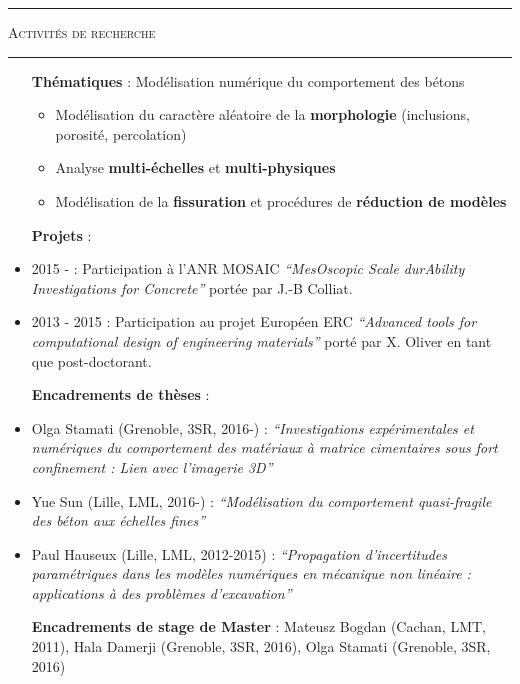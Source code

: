 \documentclass[a4paper,11pt]{article}
\newcommand{\titre}[1]{
  \begin{center}
    \rule{0.4\textwidth}{0.5pt}
    \par\vspace{0.1cm}
    \textsc{\large #1}
    \par\vspace{-0.2cm}
    \par\noindent\rule{0.4\textwidth}{0.5pt}
  \end{center}
}
\begin{document}
\newpage
\titre{Activités de recherche}
\begin{itemize}
  \item[\textbf{Thématiques}] : Modélisation numérique du comportement des bétons
    \begin{itemize}
    \item Modélisation du caractère aléatoire de la \textbf{morphologie} (inclusions, porosité, percolation)
    \item Analyse \textbf{multi-échelles} et \textbf{multi-physiques}
    \item Modélisation de la \textbf{fissuration} et procédures de \textbf{réduction de modèles}
    \end{itemize}
  \item[\textbf{Projets}] :
  \item 2015 - : Participation à l'ANR MOSAIC \textit{``MesOscopic Scale durAbility Investigations for Concrete''} portée par J.-B Colliat.
  \item 2013 - 2015 : Participation au projet Européen ERC \textit{``Advanced tools for computational design of engineering materials''} porté par X. Oliver en tant que post-doctorant.
  \item[\textbf{Encadrements de thèses}] :
  \item Olga Stamati (Grenoble, 3SR, 2016-) : \textit{``Investigations expérimentales et numériques du comportement des matériaux à matrice cimentaires sous fort confinement : Lien avec l'imagerie 3D''}
  \item Yue Sun (Lille, LML, 2016-) : \textit{``Modélisation du comportement quasi-fragile des béton aux échelles fines''}
  \item Paul Hauseux (Lille, LML, 2012-2015) : \textit{``Propagation d’incertitudes paramétriques dans les modèles numériques en mécanique non linéaire : applications à des problèmes d’excavation''}
  \item[\textbf{Encadrements de stage de Master}] : Mateusz Bogdan (Cachan, LMT, 2011), Hala Damerji (Grenoble, 3SR, 2016), Olga Stamati (Grenoble, 3SR, 2016)

\end{itemize}
\end{document}
